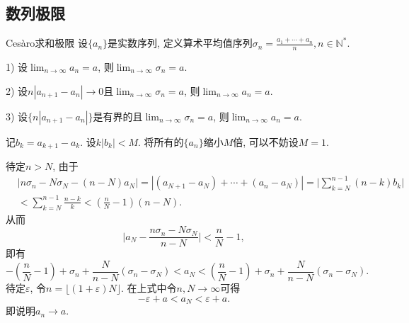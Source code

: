 \clearpage
\subsection{数列极限}

\begin{exercise}{Cesàro求和极限} \label{exer:cesaro_limit}%
	设$\{ a_n \}$是实数序列, 定义算术平均值序列$\sigma _n = \frac{a_1+\cdots + a_n}{n}, n \in \mathbb{N}^{*}$. 

	1) 设$\lim_{n\to \infty} a_n=a$, 则$\lim_{n\to \infty} \sigma _n=a$. 

	2) 设$n|a_{n+1}-a_n| \to 0$且$\lim_{n\to \infty} \sigma _n=a$, 则$\lim_{n\to \infty} a_n=a$. 

	3) 设$\{ n|a_{n+1}-a_n| \}$是有界的且$\lim_{n\to \infty} \sigma _n=a$, 则$\lim_{n\to \infty} a_n=a$. 
\end{exercise}
\begin{solution}
	记$b_k=a_{k+1}-a_k$. 设$k|b_k|<M$. 将所有的$\{ a_n \}$缩小$M$倍, 可以不妨设$M=1$. 
	
	待定$n>N$, 由于
	\begin{align*}
		&|n\sigma _n - N\sigma _N - (n-N)a_N| = |(a_{N+1}-a_N) + \cdots + (a_{n}-a_N)| = \big|\sum_{k=N}^{n-1} (n-k)b_k \big| \\
		&< \sum_{k=N}^{n-1} \frac{n-k}{k} < \left( \frac{n}{N}-1 \right) (n-N). 
	\end{align*}
	从而$$\big| a_N - \frac{n\sigma _n - N\sigma _N}{n-N} \big| < \frac{n}{N} - 1,$$
	即有$$-\left(\frac{n}{N}-1 \right) + \sigma _n + \frac{N}{n-N}(\sigma _n - \sigma _N) < a_N < \left(\frac{n}{N}-1 \right) + \sigma _n + \frac{N}{n-N}(\sigma _n - \sigma _N).$$
	待定$\varepsilon$, 令$n = \lfloor (1+\varepsilon ) N \rfloor$. 在上式中令$n,N\to \infty$可得$$-\varepsilon + a < a_N < \varepsilon +a.$$
	即说明$a_n \to a$. 	
\end{solution}

